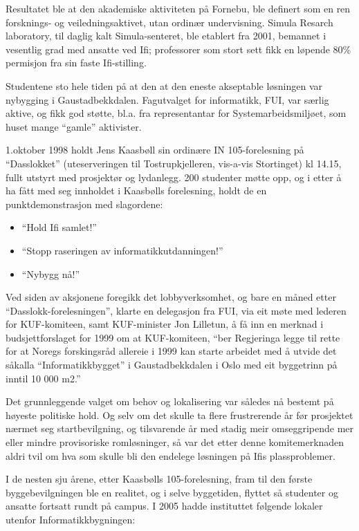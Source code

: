 Resultatet ble at den akademiske aktiviteten på Fornebu, ble definert som en ren forsknings- og veiledningsaktivet, utan ordinær undervisning. Simula Resarch laboratory, til daglig kalt Simula-senteret, ble etablert fra 2001, bemannet i vesentlig grad med ansatte ved Ifi; professorer som stort sett fikk en løpende 80\% permisjon fra sin faste Ifi-stilling.

Studentene sto hele tiden på at den at den eneste akseptable løsningen var nybygging i Gaustadbekkdalen. Fagutvalget for informatikk, FUI, var særlig aktive, og fikk god støtte, bl.a. fra representantar for Systemarbeidsmiljøet, som huset mange ``gamle'' aktivister.

1.oktober 1998 holdt Jens Kaasbøll sin ordinære IN 105-forelesning på ``Dasslokket'' (uteserveringen til Tostrupkjelleren, vis-a-vis Stortinget) kl 14.15, fullt utstyrt med prosjektør og lydanlegg. 200 studenter møtte opp, og i etter å ha fått med seg innholdet i Kaasbølls forelesning, holdt de en punktdemonstrasjon med slagordene:

\begin{itemize}
	\item ``Hold Ifi samlet!''
	\item ``Stopp raseringen av informatikkutdanningen!''
	\item ``Nybygg nå!''
\end{itemize}

Ved siden av aksjonene foregikk det lobbyverksomhet, og bare en måned etter ``Dasslokk-forelesningen'', klarte en delegasjon fra FUI, via eit møte med lederen for KUF-komiteen, samt KUF-minister Jon Lilletun, å få inn en merknad i budsjettforslaget for 1999 om at KUF-komiteen, ``ber Regjeringa legge til rette for at Noregs forskingsråd allereie i 1999 kan starte arbeidet med å utvide det såkalla ``Informatikkbygget'' i Gaustadbekkdalen i Oslo med eit byggetrinn på inntil 10 000 m2.''

Det grunnleggende valget om behov og lokalisering var således nå bestemt på høyeste politiske hold. Og selv om det skulle ta flere frustrerende år før prosjektet nærmet seg startbevilgning, og tilsvarende år med stadig meir omseggripende mer eller mindre provisoriske romløsninger, så var det etter denne komitemerknaden aldri tvil om hva som skulle bli den endelege løsningen på Ifis plassproblemer.

I de nesten sju årene, etter Kaasbølls 105-forelesning, fram til den første byggebevilgningen ble en realitet, og i selve byggetiden, flyttet så studenter og ansatte fortsatt rundt på campus. I 2005 hadde instituttet følgende lokaler utenfor Informatikkbygningen:

